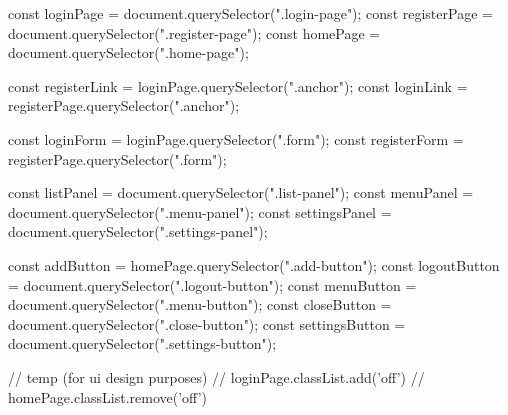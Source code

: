 const loginPage = document.querySelector(".login-page");
const registerPage = document.querySelector(".register-page");
const homePage = document.querySelector(".home-page");

const registerLink = loginPage.querySelector(".anchor");
const loginLink = registerPage.querySelector(".anchor");

const loginForm = loginPage.querySelector(".form");
const registerForm = registerPage.querySelector(".form");

const listPanel = document.querySelector(".list-panel");
const menuPanel = document.querySelector(".menu-panel");
const settingsPanel = document.querySelector(".settings-panel");

const addButton = homePage.querySelector(".add-button");
const logoutButton = document.querySelector(".logout-button");
const menuButton = document.querySelector(".menu-button");
const closeButton = document.querySelector(".close-button");
const settingsButton = document.querySelector(".settings-button");

// temp (for ui design purposes)
// loginPage.classList.add('off')
// homePage.classList.remove('off')
